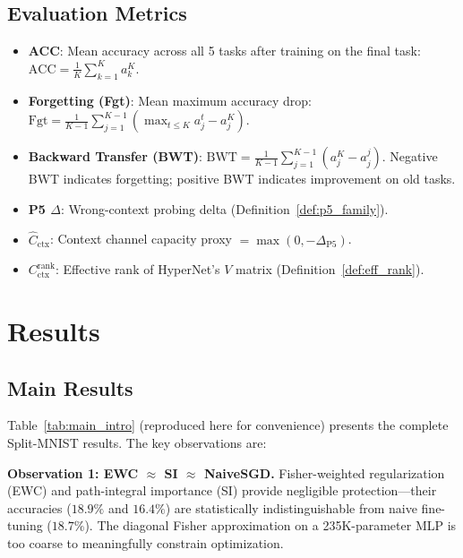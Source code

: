 \documentclass{article}
\begin{document}
\subsection{Evaluation Metrics}

\begin{itemize}
    \item \textbf{ACC}: Mean accuracy across all 5 tasks after training on the final task: $\mathrm{ACC} = \frac{1}{K}\sum_{k=1}^K a_k^K$.
    \item \textbf{Forgetting (Fgt)}: Mean maximum accuracy drop: $\mathrm{Fgt} = \frac{1}{K-1}\sum_{j=1}^{K-1}(\max_{t \leq K} a_j^t - a_j^K)$.
    \item \textbf{Backward Transfer (BWT)}: $\mathrm{BWT} = \frac{1}{K-1}\sum_{j=1}^{K-1}(a_j^K - a_j^j)$. Negative BWT indicates forgetting; positive BWT indicates improvement on old tasks.
    \item \textbf{P5 $\Delta$}: Wrong-context probing delta (Definition~\ref{def:p5_family}).
    \item \textbf{$\hat{C}_\mathrm{ctx}$}: Context channel capacity proxy $= \max(0, -\Delta_\mathrm{P5})$.
    \item \textbf{$C_\mathrm{ctx}^\mathrm{rank}$}: Effective rank of HyperNet's $V$ matrix (Definition~\ref{def:eff_rank}).
\end{itemize}


\section{Results}
\label{sec:results_full}

\subsection{Main Results}
\label{sec:main_results}

Table~\ref{tab:main_intro} (reproduced here for convenience) presents the complete Split-MNIST results. The key observations are:

\textbf{Observation 1: EWC $\approx$ SI $\approx$ NaiveSGD.} Fisher-weighted regularization (EWC) and path-integral importance (SI) provide negligible protection---their accuracies ($18.9\%$ and $16.4\%$) are statistically indistinguishable from naive fine-tuning ($18.7\%$). The diagonal Fisher approximation on a 235K-parameter MLP is too coarse to meaningfully constrain optimization.
\end{document}
